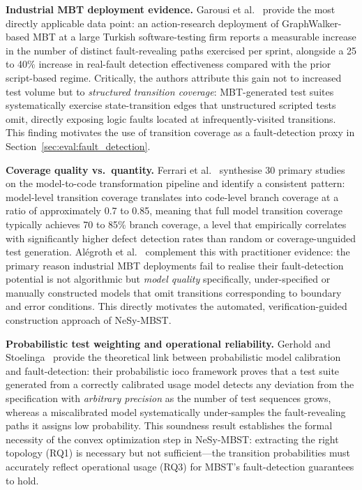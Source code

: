 \textbf{Industrial MBT deployment evidence.}
Garousi et al.~\cite{garousi2021mbt_practice} provide the most
directly applicable data point: an action-research deployment of
GraphWalker-based MBT at a large Turkish software-testing firm
reports a measurable increase in the number of distinct fault-revealing
paths exercised per sprint, alongside a 25 to 40\% increase in
real-fault detection effectiveness compared with the prior
script-based regime.  Critically, the authors attribute this gain
not to increased test volume but to \emph{structured transition
coverage}: MBT-generated test suites systematically exercise
state-transition edges that unstructured scripted tests omit, directly
exposing logic faults located at infrequently-visited transitions.
This finding motivates the use of transition coverage as a
fault-detection proxy in Section~\ref{sec:eval:fault_detection}.

\textbf{Coverage quality vs.\ quantity.}
Ferrari et al.~\cite{ferrari2023transforming} synthesise 30 primary
studies on the model-to-code transformation pipeline and identify a
consistent pattern: model-level transition coverage translates into
code-level branch coverage at a ratio of approximately 0.7 to 0.85,
meaning that full model transition coverage typically achieves
70 to 85\% branch coverage, a level that empirically correlates with
significantly higher defect detection rates than random or
coverage-unguided test generation.
Al\'{e}groth et al.~\cite{alegroth2022practitioners} complement this
with practitioner evidence: the primary reason industrial MBT
deployments fail to realise their fault-detection potential is not
algorithmic but \emph{model quality} specifically, under-specified
or manually constructed models that omit transitions corresponding
to boundary and error conditions.  This directly motivates the
automated, verification-guided construction approach of NeSy-MBST.

\textbf{Probabilistic test weighting and operational reliability.}
Gerhold and Stoelinga~\cite{gerhold2016probabilistic} provide the
theoretical link between probabilistic model calibration and
fault-detection: their probabilistic ioco framework proves that a
test suite generated from a correctly calibrated usage model detects
any deviation from the specification with \emph{arbitrary precision}
as the number of test sequences grows, whereas a miscalibrated model
systematically under-samples the fault-revealing paths it assigns low
probability.  This soundness result establishes the formal necessity
of the convex optimization step in NeSy-MBST: extracting the right
topology (RQ1) is necessary but not sufficient---the transition
probabilities must accurately reflect operational usage (RQ3) for
MBST's fault-detection guarantees to hold.

